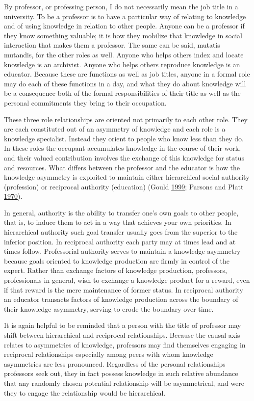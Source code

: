 \documentclass[]{book}
\theoremstyle{definition}
\theoremstyle{definition}
\theoremstyle{definition}
\theoremstyle{remark}
\begin{document}
By professor, or professing person, I do not necessarily mean the job
title in a university. To be a professor is to have a particular way of
relating to knowledge and of using knowledge in relation to other
people. Anyone can be a professor if they know something valuable; it is
how they mobilize that knowledge in social interaction that makes them a
professor. The same can be said, mutatis mutandis, for the other roles
as well. Anyone who helps others index and locate knowledge is an
archivist. Anyone who helps others reproduce knowledge is an educator.
Because these are functions as well as job titles, anyone in a formal
role may do each of these functions in a day, and what they do about
knowledge will be a consequence both of the formal responsibilities of
their title as well as the personal commitments they bring to their
occupation.

These three role relationships are oriented not primarily to each other
role. They are each constituted out of an asymmetry of knowledge and
each role is a knowledge specialist. Instead they orient to people who
know less than they do. In these roles the occupant accumulates
knowledge in the course of their work, and their valued contribution
involves the exchange of this knowledge for status and resources. What
differs between the professor and the educator is how the knowledge
asymmetry is exploited to maintain either hierarchical social authority
(profession) or reciprocal authority (education) (Gould
\protect\hyperlink{ref-Gould1999Race}{1999}; Parsons and Platt
\protect\hyperlink{ref-Parsons1970Age}{1970}).

In general, authority is the ability to transfer one's own goals to
other people, that is, to induce them to act in a way that achieves your
own priorities. In hierarchical authority such goal transfer usually
goes from the superior to the inferior position. In reciprocal authority
each party may at times lead and at times follow. Professorial authority
serves to maintain a knowledge asymmetry because goals oriented to
knowledge production are firmly in control of the expert. Rather than
exchange factors of knowledge production, professors, professionals in
general, wish to exchange a knowledge product for a reward, even if that
reward is the mere maintenance of former status. In reciprocal authority
an educator transacts factors of knowledge production across the
boundary of their knowledge asymmetry, serving to erode the boundary
over time.

It is again helpful to be reminded that a person with the title of
professor may shift between hierarchical and reciprocal relationships.
Because the causal axis relates to asymmetries of knowledge, professors
may find themselves engaging in reciprocal relationships especially
among peers with whom knowledge asymmetries are less pronounced.
Regardless of the personal relationships professors seek out, they in
fact possess knowledge in such relative abundance that any randomly
chosen potential relationship will be asymmetrical, and were they to
engage the relationship would be hierarchical.
\end{document}
